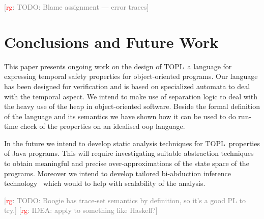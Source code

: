 \documentclass[preprint]{sigplanconf} %
\newcommand{\TPL}{TOPL}
\newcommand{\note}[2]{\textcolor{gray}{[\textcolor{red}{#1}: #2]}}
\newcommand{\rg}[1]{\note{rg}{#1}}
\theoremstyle{definition}
\theoremstyle{remark}
\begin{document}
\rg{TODO: Blame assignment --- error traces}


\section{Conclusions and Future Work}\label{sec:conclusions} %
This paper presents ongoing work on the design of  \TPL \ a language for expressing temporal safety properties for object-oriented programs.
Our language has been designed for verification and is based on specialized automata to deal with the temporal aspect.
We intend to make use of  separation logic to deal with the  heavy use of the heap in object-oriented software.
Beside the formal definition of the language and its semantics we have shown how it can be used to do run-time check of the properties
on an idealised oop language.

In the future we intend to develop static analysis techniques for \TPL \ properties of Java programs.
This will require investigating suitable abstraction techniques to obtain meaningful and precise over-approximations
of the state space of the programs. Moreover we intend to develop tailored bi-abduction inference technology~\cite{dblp:conf/popl/CalcagnoDOY09} which would to help with scalability of the analysis.

\rg{TODO: Boogie has trace-set semantics by definition, so it's a good PL to try.}
\rg{IDEA: apply to something like Haskell?}


\softraggedright


\end{document}
